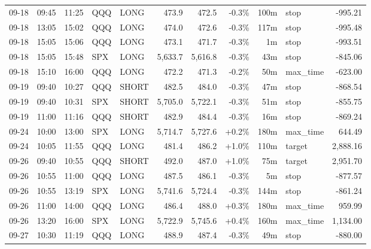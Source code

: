 \documentclass[11pt,a4paper,twoside]{article}
\begin{document}
\begin{center}
\begin{longtable}{>{\color{txtmain}}l l l l l r r r r >{\color{txtmain}}l r}
09-18 & 09:45 & 11:25 & QQQ & LONG & 473.9 & 472.5 & \textcolor{lossred}{-0.3\%} & 100m & stop & \textcolor{lossred}{-995.21} \\
09-18 & 13:05 & 15:02 & QQQ & LONG & 474.0 & 472.6 & \textcolor{lossred}{-0.3\%} & 117m & stop & \textcolor{lossred}{-995.48} \\
09-18 & 15:05 & 15:06 & QQQ & LONG & 473.1 & 471.7 & \textcolor{lossred}{-0.3\%} & 1m & stop & \textcolor{lossred}{-993.51} \\
09-18 & 15:05 & 15:48 & SPX & LONG & 5,633.7 & 5,616.8 & \textcolor{lossred}{-0.3\%} & 43m & stop & \textcolor{lossred}{-845.06} \\
09-18 & 15:10 & 16:00 & QQQ & LONG & 472.2 & 471.3 & \textcolor{lossred}{-0.2\%} & 50m & max\_time & \textcolor{lossred}{-623.00} \\
09-19 & 09:40 & 10:27 & QQQ & SHORT & 482.5 & 484.0 & \textcolor{lossred}{-0.3\%} & 47m & stop & \textcolor{lossred}{-868.54} \\
09-19 & 09:40 & 10:31 & SPX & SHORT & 5,705.0 & 5,722.1 & \textcolor{lossred}{-0.3\%} & 51m & stop & \textcolor{lossred}{-855.75} \\
09-19 & 11:00 & 11:16 & QQQ & SHORT & 482.9 & 484.4 & \textcolor{lossred}{-0.3\%} & 16m & stop & \textcolor{lossred}{-869.24} \\
09-24 & 10:00 & 13:00 & SPX & LONG & 5,714.7 & 5,727.6 & \textcolor{wingreen}{+0.2\%} & 180m & max\_time & \textcolor{wingreen}{644.49} \\
09-24 & 10:05 & 11:55 & QQQ & LONG & 481.4 & 486.2 & \textcolor{wingreen}{+1.0\%} & 110m & target & \textcolor{wingreen}{2,888.16} \\
09-26 & 09:40 & 10:55 & QQQ & SHORT & 492.0 & 487.0 & \textcolor{wingreen}{+1.0\%} & 75m & target & \textcolor{wingreen}{2,951.70} \\
09-26 & 10:55 & 11:00 & QQQ & LONG & 487.5 & 486.1 & \textcolor{lossred}{-0.3\%} & 5m & stop & \textcolor{lossred}{-877.57} \\
09-26 & 10:55 & 13:19 & SPX & LONG & 5,741.6 & 5,724.4 & \textcolor{lossred}{-0.3\%} & 144m & stop & \textcolor{lossred}{-861.24} \\
09-26 & 11:00 & 14:00 & QQQ & LONG & 486.4 & 488.0 & \textcolor{wingreen}{+0.3\%} & 180m & max\_time & \textcolor{wingreen}{959.99} \\
09-26 & 13:20 & 16:00 & SPX & LONG & 5,722.9 & 5,745.6 & \textcolor{wingreen}{+0.4\%} & 160m & max\_time & \textcolor{wingreen}{1,134.00} \\
09-27 & 10:30 & 11:19 & QQQ & LONG & 488.9 & 487.4 & \textcolor{lossred}{-0.3\%} & 49m & stop & \textcolor{lossred}{-880.00} \\

\end{longtable}
\end{center}
\end{document}
